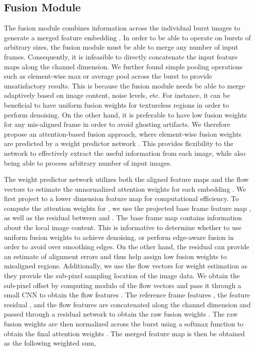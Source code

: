 \subsection{Fusion Module} 
The fusion module combines information across the individual burst images to generate a merged feature embedding . In order to be able to operate on bursts of arbitrary sizes, the fusion module must be able to merge any number of input frames. Consequently, it is infeasible to \eg directly concatenate the input feature maps along the channel dimension. We further found simple pooling operations such as element-wise max or average pool across the burst to provide unsatisfactory results. This is because the fusion module needs be able to merge adaptively based on \eg image content, noise levels, etc. For instance, it can be beneficial to have uniform fusion weights for textureless regions in order to perform denoising. On the other hand, it is preferable to have low fusion weights for any mis-aligned frame in order to avoid ghosting artifacts.  
We therefore propose an attention-based fusion approach, where element-wise fusion weights are predicted by a weight predictor network . This provides flexibility to the network to effectively extract the useful information from each image, while also being able to process arbitrary number of input images. 


The weight predictor network  utilizes both the aligned feature maps  and the flow vectors  to estimate the unnormalized attention weights  for each embedding . We first project  to a lower dimension feature map  for computational efficiency. To compute the attention weights for , we use the projected base frame feature map , as well as the residual  between  and . The base frame map  contains information about the local image content. This is informative to determine \eg whether to use uniform fusion weights to achieve denoising, or perform edge-aware fusion in order to avoid over smoothing edges. On the other hand, the residual  can provide an estimate of alignment errors and thus help assign low fusion weights to misaligned regions. Additionally, we use the flow vectors  for weight estimation as they provide the sub-pixel sampling location of the image data. 
We obtain the sub-pixel offset by computing modulo  of the flow vectors  and pass it through a small CNN to obtain the flow features . The reference frame features , the feature residual , and the flow features  are concatenated along the channel dimension and passed through a residual network to obtain the raw fusion weights . The raw fusion weights are then normalized across the burst using a softmax function to obtain the final attention weights . The merged feature map  is then be obtained as the following weighted sum,

